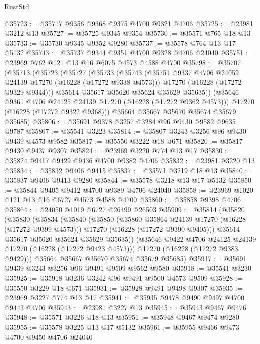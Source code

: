 \begin{lexlean}{RustStd}
\begin{coremodule}
@35723 := @35717 @9356 @9368 @9375 @4700 @9321 @4706
@35725 := @23981 @3212 @13
@35727 := @35725 @9345 @9354
@35730 := @35571 @765 @18 @13
@35733 := @35730 @9345 @9352 @9280
@35737 := @35578 @764 @13 @17 @5132
@35743 := @35737 @9344 @9351 @4700 @9328 @4706 @24040
@35751 := @23969 @762 @121 @13 @16 @6075 @4573 @4588 @4700
@35798 := @35707
    (@35713
      (@35723
        (@35727
          (@35733
            (@35743
              (@35751 @9337 @4706 @24059 @24139 @17270 (@16228 (@17272 @9338 @4573)))
              @17270
              (@16228 (@17272 @9329 @9344)))
            @35614
            @35617
            @35620
            @35624
            @35629
            @35635))
        (@35646 @9361 @4706 @24125 @24139 @17270 (@16228 (@17272 @9362 @4573)))
        @17270
        (@16228 (@17272 @9322 @9368)))
      @35664
      @35667
      @35670
      @35674
      @35679
      @35685)
@35806 := @35691 @9378 @3257 @3284 @96 @9430 @9582 @9635 @9787
@35807 := @35541 @3223
@35814 := @35807 @3243 @3256 @96 @9430 @9439 @4573 @9582
@35817 := @35550 @3222 @18 @671
@35820 := @35817 @9430 @9437 @9307
@35824 := @23969 @3220 @774 @13 @17
@35830 := @35824 @9417 @9429 @9436 @4700 @9382 @4706
@35832 := @23981 @3220 @13
@35834 := @35832 @9406 @9415
@35837 := @35571 @3219 @18 @13
@35840 := @35837 @9406 @9413 @9280
@35844 := @35578 @3218 @13 @17 @5132
@35850 := @35844 @9405 @9412 @4700 @9389 @4706 @24040
@35858 := @23969 @1020 @121 @13 @16 @6727 @4573 @4588 @4700
@35860 := @35858 @9398 @4706
@35864 := @24050 @1019 @6727 @26499 @26503
@35909 := @35814
    (@35820
      (@35830
        (@35834
          (@35840
            (@35850
              (@35860 @35864 @24139 @17270 (@16228 (@17272 @9399 @4573)))
              @17270
              (@16228 (@17272 @9390 @9405)))
            @35614
            @35617
            @35620
            @35624
            @35629
            @35635))
        (@35646 @9422 @4706 @24125 @24139 @17270 (@16228 (@17272 @9423 @4573)))
        @17270
        (@16228 (@17272 @9383 @9429)))
      @35664
      @35667
      @35670
      @35674
      @35679
      @35685)
@35917 := @35691 @9439 @3243 @3256 @96 @9491 @9509 @9562 @9580
@35918 := @35541 @3230
@35925 := @35918 @3236 @3242 @96 @9491 @9500 @4573 @9509
@35928 := @35550 @3229 @18 @671
@35931 := @35928 @9491 @9498 @9307
@35935 := @23969 @3227 @774 @13 @17
@35941 := @35935 @9478 @9490 @9497 @4700 @9443 @4706
@35943 := @23981 @3227 @13
@35945 := @35943 @9467 @9476
@35948 := @35571 @3226 @18 @13
@35951 := @35948 @9467 @9474 @9280
@35955 := @35578 @3225 @13 @17 @5132
@35961 := @35955 @9466 @9473 @4700 @9450 @4706 @24040

\end{coremodule}
\end{lexlean}
